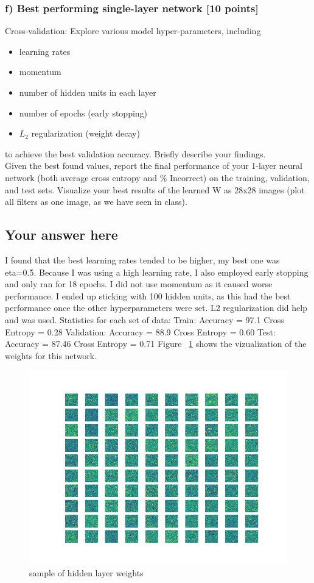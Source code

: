 \documentclass{article}
\begin{document}
\subsubsection*{f) Best performing single-layer network [10 points]}
Cross-validation: 
Explore various model hyper-parameters, including 
\begin{itemize}
\item learning rates
\vspace{-0.09in}
\item momentum
\vspace{-0.09in}
\item number of hidden units in each layer
\vspace{-0.09in}
\item number of epochs (early stopping)
\vspace{-0.09in}
\item $L_2$ regularization (weight decay)
\end{itemize}
to achieve the best validation accuracy. Briefly describe your findings.
\\

Given the best found values, report the final performance of your 1-layer neural
network (both average cross entropy and \% Incorrect) on the training, validation, and test sets.
Visualize your best results of the learned W as 28x28 images 
(plot all filters as one image, as we have seen in class).

\subsection*{Your answer here}
I found that the best learning rates tended to be higher, my best one was eta=0.5. Because I was using a high learning rate, I also employed early stopping and only ran for 18 epochs. I did not use momentum as it caused worse performance. I ended up sticking with 100 hidden units, as this had the best performance once the other hyperparameters were set. L2 regularization did help and was used.
Statistics for each set of data:
Train:
Accuracy = 97.1
Cross Entropy = 0.28
Validation:
Accuracy = 88.9
Cross Entropy = 0.60
Test:
Accuracy = 87.46
Cross Entropy = 0.71
Figure ~\ref{fig:weights2} shows the vizualization of the weights for this network.

\begin{figure}[h]
\centering
\includegraphics[width=.7\linewidth]{q6f_weights.png}
\caption{sample of hidden layer weights}
\label{fig:weights2}
\end{figure}
\end{document}
